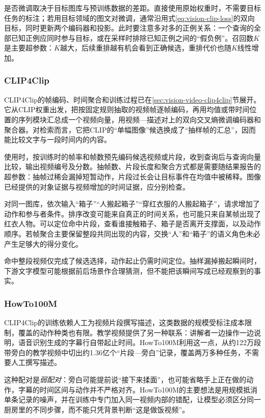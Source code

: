 是否微调取决于目标图库与预训练数据的差距。直接使用原始权重时，不需要目标任务的标注；若用目标领域的图文对微调，通常沿用式\eqref{eq:vision-clip-loss}的双向目标，同时更新两个编码器和投影。此时要注意多对多的正例关系：一个查询的全部已知正例应同时参与目标，或在采样时排除已知正例之间的“假负例”。召回数$K$是主要超参数：$K$越大，后续重排越有机会看到正确候选，重排代价也随$K$线性增加。

\subsubsection{CLIP4Clip}
\label{sec:vision-understanding-clip4clip}

CLIP4Clip的帧编码、时间聚合和训练过程已在\ref{sec:vision-video-clip4clip}节展开。它从CLIP权重出发，把按固定规则抽取的视频帧逐帧编码，再用均值或带时间位置的序列模块汇总成一个视频向量，用视频—描述对上的双向交叉熵微调编码器和聚合器。对检索而言，它把CLIP的“单幅图像”候选换成了“抽样帧的汇总”，因而能比较文字与一段时间内的内容。

使用时，按训练时的帧率和帧数预先编码候选视频或片段，收到查询后与查询向量比较，输出视频编号及分数。抽帧数、片段长度和聚合方式都是需要随结果报告的超参数：抽帧过稀会漏掉短暂动作，片段过长会让目标事件在均值中被稀释。图像已经提供的对象证据与视频增加的时间证据，应分别检查。

对同一图库，依次输入“箱子”“人搬起箱子”“穿红衣服的人搬起箱子”，请求增加了动作和参与者条件。排序改变可能来自真正的时间关系，也可能只来自某帧出现了红衣人物。可以定位命中片段，查看谁接触箱子、箱子是否离开支撑面，以及动作顺序。若帧聚合主要保留整段共同出现的内容，交换“人”和“箱子”的语义角色未必产生足够大的得分变化。

命中整段视频仅完成了候选选择，动作起止仍需时间定位。抽样漏掉搬起瞬间时，下游文字模型可能根据前后场景作合理猜测，但不能把该瞬间写成已经观察到的事实。

\subsubsection{HowTo100M}
\label{sec:vision-understanding-howto}

CLIP4Clip的训练依赖人工为视频片段撰写描述，这类数据的规模受标注成本限制，覆盖的动作种类也有限。教学视频提供了另一种联系：讲解者一边操作一边说明，语音识别生成的字幕行自带起止时间。HowTo100M利用这一点，从约122万段带旁白的教学视频中切出约1.36亿个“片段—旁白”记录，覆盖两万多种任务，不需要人工撰写描述。

这种配对是\emph{弱配对}：旁白可能提前说“接下来揉面”，也可能省略手上正在做的动作，字幕的时间区间与动作并不严格对齐。HowTo100M的主要想法是用规模抵消单条记录的噪声，并在训练中专门加入同一视频内部的错配，让模型必须区分同一厨房里的不同步骤，而不能只凭背景判断“这是做饭视频”。


